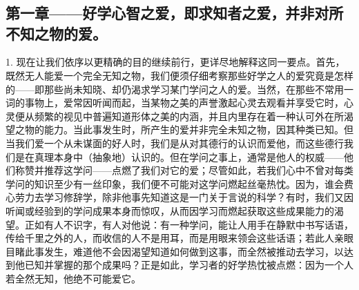 

\section{}

\par


\subsection{第一章——好学心智之爱，即求知者之爱，并非对所不知之物的爱。}

1. 现在让我们依序以更精确的目的继续前行，更详尽地解释这同一要点。首先，既然无人能爱一个完全无知之物，我们便须仔细考察那些好学之人的爱究竟是怎样的——即那些尚未知晓、却仍渴求学习某门学问之人的爱。当然，在那些不常用一词的事物上，爱常因听闻而起，当某物之美的声誉激起心灵去观看并享受它时，心灵便从频繁的视见中普遍知道形体之美的内涵，并且内里存在着一种认可外在所渴望之物的能力。当此事发生时，所产生的爱并非完全未知之物，因其种类已知。但当我们爱一个从未谋面的好人时，我们是从对其德行的认识而爱他，而这些德行我们是在真理本身中（抽象地）认识的。但在学问之事上，通常是他人的权威——他们称赞并推荐这学问——点燃了我们对它的爱；尽管如此，若我们心中不曾对每类学问的知识至少有一丝印象，我们便不可能对这学问燃起丝毫热忱。因为，谁会费心劳力去学习修辞学，除非他事先知道这是一门关于言说的科学？有时，我们又因听闻或经验到的学问成果本身而惊叹，从而因学习而燃起获取这些成果能力的渴望。正如有人不识字，有人对他说：有一种学问，能让人用手在静默中书写话语，传给千里之外的人，而收信的人不是用耳，而是用眼来领会这些话语；若此人亲眼目睹此事发生，难道他不会因渴望知道如何做到这事，而全然被推动去学习，以达到他已知并掌握的那个成果吗？正是如此，学习者的好学热忱被点燃：因为一个人若全然无知，他绝不可能爱它。\par

